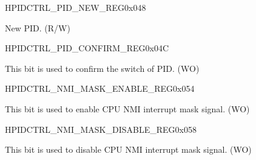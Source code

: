     
    \begin{register}{H}{PIDCTRL\_PID\_NEW\_REG}{0x048}\label{regdesc:PIDCTRLPIDNEWREG}
    \regnewline%
    \begin{regdesc}\begin{reglist}
    \item [PIDCTRL\_PID\_NEW]New PID. (R/W)
    \end{reglist}\end{regdesc}
    \end{register}
    
    
    \begin{register}{H}{PIDCTRL\_PID\_CONFIRM\_REG}{0x04C}\label{regdesc:PIDCTRLPIDCONFIRMREG}
    \regnewline%
    \begin{regdesc}\begin{reglist}
    \item [PIDCTRL\_PID\_CONFIRM]This bit is used to confirm the switch of PID. (WO)
    \end{reglist}\end{regdesc}
    \end{register}
    
    
    \begin{register}{H}{PIDCTRL\_NMI\_MASK\_ENABLE\_REG}{0x054}\label{regdesc:PIDCTRLNMIMASKENABLEREG}
    \regnewline%
    \begin{regdesc}\begin{reglist}
    \item [PIDCTRL\_NMI\_MASK\_ENABLE]This bit is used to enable CPU NMI interrupt mask signal. (WO)
    \end{reglist}\end{regdesc}
    \end{register}
    
    
    \begin{register}{H}{PIDCTRL\_NMI\_MASK\_DISABLE\_REG}{0x058}\label{regdesc:PIDCTRLNMIMASKDISABLEREG}
    \regnewline%
    \begin{regdesc}\begin{reglist}
    \item [PIDCTRL\_NMI\_MASK\_DISABLE]This bit is used to disable CPU NMI interrupt mask signal. (WO)
    \end{reglist}\end{regdesc}
    \end{register}